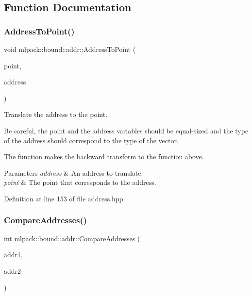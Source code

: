 \subsection{Function Documentation}
\mbox{\label{namespacemlpack_1_1bound_1_1addr_a55e57f732bc2f6f587b58e59d6fb918a}} 
\subsubsection{Address\+To\+Point()}
{\footnotesize\ttfamily void mlpack\+::bound\+::addr\+::\+Address\+To\+Point (\begin{DoxyParamCaption}\item[{Vec\+Type \&}]{point,  }\item[{const Address\+Type \&}]{address }\end{DoxyParamCaption})}



Translate the address to the point. 

Be careful, the point and the address variables should be equal-\/sized and the type of the address should correspond to the type of the vector.

The function makes the backward transform to the function above.


\begin{DoxyParams}{Parameters}
{\em address} & An address to translate. \\
\hline
{\em point} & The point that corresponds to the address. \\
\hline
\end{DoxyParams}


Definition at line 153 of file address.\+hpp.

\mbox{\label{namespacemlpack_1_1bound_1_1addr_ad39b49870fa074ad011a4d4c0ee93665}} 
\subsubsection{Compare\+Addresses()}
{\footnotesize\ttfamily int mlpack\+::bound\+::addr\+::\+Compare\+Addresses (\begin{DoxyParamCaption}\item[{const Address\+Type1 \&}]{addr1,  }\item[{const Address\+Type2 \&}]{addr2 }\end{DoxyParamCaption})}




